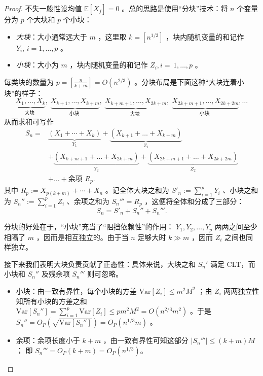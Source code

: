 \begin{proof}

不失一般性设均值 $\mathbb {E}[X_j]=0$ 。总的思路是使用``分块''技术：将 $n$ 个变量分为 $p$ 个大块和 $p$ 个小块：

\begin{itemize}
\tightlist
\item
  \emph{大块}：大小通常远大于 $m$ ，这里取 $k = [n^{1/3}]$ ，块内随机变量的和记作 $Y_i,\,i=1,\dots,p$ 。
\item
  \emph{小块}：大小为 $m$ ，块内随机变量的和记作 $Z_i,i=\,1,\dots,p$ 。
\end{itemize}

每类块的数量为 $p=\left[\frac n{k+m}\right]=O(n^{2/3})$ 。分块布局是下面这种``大块连着小块''的样子：
\[\underbrace{X_1 ,\dots, X_k}_{\text{大块 }},\; \underbrace{X_{k+1}, \dots ,X_{k+m}}_{\text{小块 }},\; \underbrace{X_{k+m+1} ,\dots, X_{2k+m}}_{\text{大块 }},\; \underbrace{X_{2k+m+1}, \dots, X_{2k+2m}}_{\text{小块 }},\dots\]
从而求和可写作
\[
\begin{aligned}
S_n={}&\underbrace{(X_1+ \cdots+ X_k)}_{Y_1} + \underbrace{(X_{k+1}+ \dots +X_{k+m})}_{Z_1}\\
&+ \underbrace{(X_{k+m+1} +\dots +X_{2k+m})}_{Y_2}+ \underbrace{(X_{2k+m+1}+ \dots +X_{2k+2m})}_{Z_2}\\
&+ \dots + \text{余项 } R_p.
\end{aligned}
\]
其中 $R_p:=X_{p(k+m)}+\cdots+X_n$ 。记全体大块之和为 $S'_n:=\sum\limits_{i=1}^pY_i$ 、小块之和为 $S_n'':=\sum\limits_{i=1}^{p}Z_i$ 、余项之和为 $S_n'''=R_p$ ，这便将全体和分成了三部分：
\[
S_n=S'_n+S_n''+S_n'''.
\]

分块的好处在于，``小块''充当了``阻挡依赖性''的作用： $Y_1,Y_2,\dots,Y_p$ 两两之间至少相隔了 $m$ ，因而是相互独立的。由于当 $n$ 足够大时 $k\gg m$ ，因而 $Z_i$ 之间也同样独立。

接下来我们表明大块负责贡献了正态性：具体来说，大块之和 $S_n'$ 满足 CLT，而小块和 $S_n''$ 及残余项 $S_n'''$ 则可忽略。

\begin{itemize}
\tightlist
\item
  小块：由一致有界性，每个小块的方差 $\mathrm{Var}[Z_i]\le m^2M^2$ ；由 $Z_i$ 两两独立性知所有小块的方差之和 $\mathrm{Var}[S_n'']=\sum_{i=1}^p\mathrm{Var}[Z_i]\le pm^2M^2=O(n^{2/3}m^2)$ 。于是 $S_n''=O_P(\sqrt{\mathrm{Var}[S_n'']})=O_P(n^{1/3}m)$ 。
\item
  余项：余项长度小于 $k+m$ ，由一致有界性可知这部分 $|S_n'''|\le (k+m) M$； 即 $S_n'''=O_P(k+m) = O_P(n^{1/3})$。
\end{itemize}


\end{proof}
